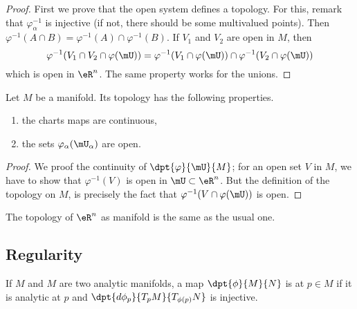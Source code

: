 \begin{proof}
	First we prove that the open system defines a topology. For this, remark that $\varphi_{\alpha}^{-1}$ is injective (if not, there should be some multivalued points). Then $\varphi^{-1}(A\cap B)=\varphi^{-1}(A)\cap\varphi^{-1}(B)$. If $V_1$ and $V_2$ are open in $M$, then
	\begin{equation}
		\varphi^{-1}(V_1\cap V_2\cap\varphi(\mU))=\varphi^{-1}(V_1\cap\varphi(\mU))\cap\varphi^{-1}(V_2\cap\varphi(\mU))
	\end{equation}
	which is open in $\eR^n$. The same property works for the unions.
\end{proof}

\begin{theorem}     \label{THOooIAXUooDqMrav}
	Let \( M\) be a manifold. Its topology has the following properties.
	\begin{enumerate}
		\item the charts maps are continuous,
		\item the sets $\varphi_{\alpha}(\mU_{\alpha})$ are open.
	\end{enumerate}
\end{theorem}

\begin{proof}
	We proof the continuity of $\dpt{\varphi}{\mU}{M}$; for an open set $V$ in $M$, we have to show that $\varphi^{-1}(V)$ is open in $\mU\subset\eR^n$. But the definition of the topology on $M$, is precisely the fact that $\varphi^{-1}(V\cap\varphi(\mU))$ is open.
\end{proof}

\begin{lemma}       \label{LEMooGDMZooLCtnuA}
	The topology of \( \eR^n\) as manifold is the same as the usual one.
\end{lemma}

\subsection{Regularity}

\begin{definition}      \label{DEFooMELXooEkEnwz}
	If $M$ and $M$ are two analytic manifolds, a map $\dpt{\phi}{M}{N}$ is \label{PgDefRegular} at $p\in M$ if it is analytic at $p$ and $\dpt{d\phi_p}{T_pM}{T_{\phi(p)}N}$ is injective.
\end{definition}

